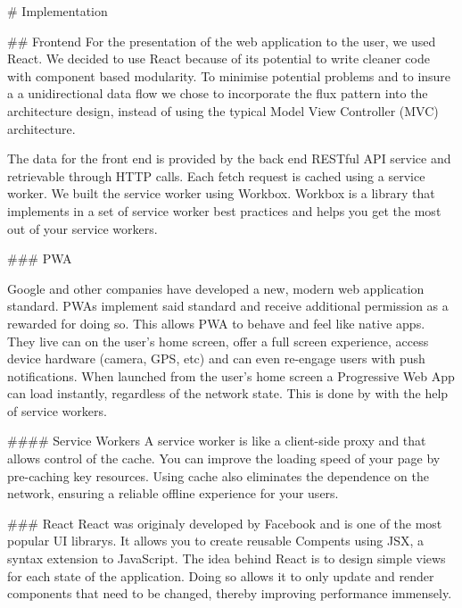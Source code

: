 \begin{markdown}

# Implementation

## Frontend
For the presentation of the web application to the user, we used React\cite{React}. We decided to use React because of its potential to write cleaner code with component based modularity. To minimise potential problems and to insure a a unidirectional data flow we chose to incorporate  the flux pattern into the architecture design, instead of using the typical Model View Controller (MVC) architecture.

The data for the front end is provided by the back end RESTful API service and retrievable through HTTP calls. Each fetch request is cached using a service worker. We built the service worker using Workbox\cite{Workbox}. Workbox is a library that implements in a set of service worker best practices and helps you get the most out of your service workers.

### PWA
\cite{WhatIsPWA}

Google and other companies have developed a new, modern web application standard. PWAs implement said standard and receive additional permission as a rewarded for doing so. This allows PWA to behave and feel like native apps. They live can on the user's home screen, offer a full screen experience, access device hardware (camera, GPS, etc) and can even re-engage users with push notifications\cite{PWA}.  When launched from the user’s home screen a Progressive Web App can load instantly, regardless of the network state. This is done by with the help of service workers.

#### Service Workers
A service worker is like a client-side proxy and that allows control of the cache. You can improve the loading speed of your page by pre-caching key resources. Using cache also eliminates the dependence on the network, ensuring a reliable offline experience for your users.\cite{ServiceWorker}

### React
React\cite{React} was originaly developed by Facebook and is one of the most popular UI librarys. It allows you to create reusable Compents using JSX, a syntax extension to JavaScript.
The idea behind React is to design simple views for each state of the application. Doing so allows it to only update and render components that need to be changed, thereby improving performance immensely.


\end{markdown}
